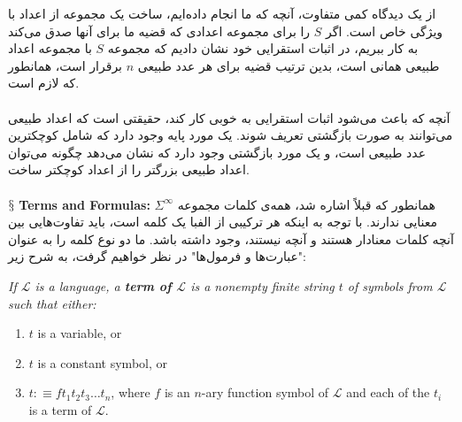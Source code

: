 \documentclass[10pt,a4paper]{article}
\newcommand{\newpoint}[1]{\indent$\mathsection$ \textbf{#1}}
\newcommand{\curveL}{\mathcal{L}}
\begin{document}
                    از یک دیدگاه کمی متفاوت، آنچه که ما انجام داده‌ایم، ساخت یک مجموعه از اعداد با ویژگی خاص است. اگر $S$ را برای مجموعه اعدادی که قضیه ما برای آنها صدق می‌کند به کار ببریم، در اثبات استقرایی خود نشان دادیم که مجموعه $S$ با مجموعه اعداد طبیعی همانی است، بدین ترتیب قضیه برای هر عدد طبیعی $n$ برقرار است، همانطور که لازم است.
                    \\
                    \\
                    آنچه که باعث می‌شود اثبات استقرایی به خوبی کار کند، حقیقتی است که اعداد طبیعی می‌توانند به صورت بازگشتی تعریف شوند. یک مورد پایه وجود دارد که شامل کوچکترین عدد طبیعی است، و یک مورد بازگشتی وجود دارد که نشان می‌دهد چگونه می‌توان اعداد طبیعی بزرگتر را از اعداد کوچکتر ساخت.
                    \\
                    \\
                    \newpoint{Terms and Formulas:} همانطور که قبلاً اشاره شد، همه‌ی کلمات مجموعه $\Sigma^\infty$ معنایی ندارند. با توجه به اینکه هر ترکیبی از الفبا یک کلمه است، باید تفاوت‌هایی بین آنچه کلمات معنادار هستند و آنچه نیستند، وجود داشته باشد. ما دو نوع کلمه را به عنوان "عبارت‌ها و فرمول‌ها" در نظر خواهیم گرفت، به شرح زیر:
                    \begin{define}
                        \textit{If $\curveL$ is a language, a \textbf{term of $\curveL$} is a nonempty finite string $t$ of symbols from $\curveL$ such that either:}
                        \begin{enumerate}
                            \item $t$ is a variable, or
                            \item $t$ is a constant symbol, or 
                            \item $t:\equiv ft_1t_2t_3\dots t_n$, where $f$ is an $n$-ary function symbol of $\curveL$ and each of the $t_i$ is a term of $\curveL$.
                        \end{enumerate}
                    \end{define}
\end{document}
